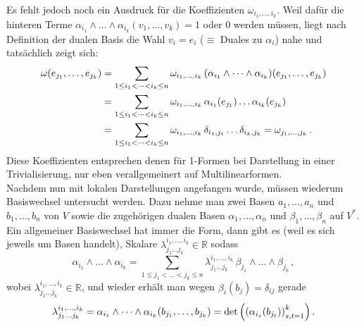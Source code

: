 \documentclass[../H_Analysis_main.tex]{subfiles}
\begin{document}
Es fehlt jedoch noch ein Ausdruck für die Koeffizienten $\omega_{i_1, \dots, i_k}$. Weil dafür die hinteren Terme $\alpha_{i_1} \wedge \dots \wedge \alpha_{i_k}(v_1, \dots, v_k) = 1$ oder 0 werden müssen, liegt nach Definition der dualen Basis die Wahl $v_i = e_i$ ($\equiv$ Duales zu $\alpha_i$) nahe und tatsächlich zeigt sich:
\begin{equation}
\begin{split}
\omega(e_{j_1}, \dots, e_{j_k}) &= \sum_{1 \leq i_1 < \dots < i_k \leq n} \omega_{i_1, \dots, i_k} \, \qty(\alpha_{i_1} \wedge \dots \wedge \alpha_{i_k})(e_{j_1}, \dots, e_{j_k}) 
\\
&= \sum_{1 \leq i_1 < \dots < i_k \leq n} \omega_{i_1, \dots, i_k} \, \alpha_{i_1}(e_{j_1}) \dots \alpha_{i_k}(e_{j_k})
\\
&= \sum_{1 \leq i_1 < \dots < i_k \leq n} \omega_{i_1, \dots, i_k} \, \delta_{i_1, j_1} \dots \delta_{i_k, j_k} = \omega_{j_1, \dots, j_k} \, .
\end{split}
\end{equation}
Diese Koeffizienten entsprechen denen für 1-Formen bei Darstellung in einer Trivialisierung, nur eben verallgemeinert auf Multilinearformen.\\


Nachdem nun mit lokalen Darstellungen angefangen wurde, müssen wiederum Basiswechsel untersucht werden. Dazu nehme man zwei Basen $a_1, \dots, a_n$ und $b_1, \dots, b_n$ von $V$ sowie die zugehörigen dualen Basen $\alpha_1, \dots, \alpha_n$ und $\beta_1, \dots, \beta_n$ auf $V^*$. Ein allgemeiner Basiswechsel hat immer die Form, dann gibt es (weil es sich jeweils um Basen handelt), Skalare $\lambda_{j_1 \dots j_k}^{i_1, \dots, i_k} \in \mathbb{R}$ sodass
\begin{equation*}
\alpha_{i_1} \wedge \dots \wedge \alpha_{i_k} = \sum_{1 \leq j_1 < \dots < j_k \leq n} \lambda_{j_1 \dots j_k}^{i_1, \dots, i_k} \, \beta_{j_1} \wedge \dots \wedge \beta_{j_k} \, ,
\end{equation*}
wobei $\lambda_{j_1 \dots j_k}^{i_1, \dots, i_k} \in \mathbb{R}$, und wieder erhält man wegen $\beta_i(b_j) = \delta_{ij}$ gerade
\begin{equation}
\lambda_{j_1 \dots j_k}^{i_1, \dots, i_k} = \alpha_{i_1} \wedge \dots \wedge \alpha_{i_k} \qty(b_{j_1}, \dots, b_{j_k}) = \det\qty(\qty(\alpha_{i_s}(b_{j_t}))_{s, t = 1}^k) \, .
\end{equation}
\end{document}
